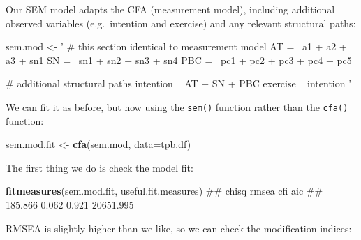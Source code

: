 \documentclass[]{article}
\newenvironment{Shaded}{\begin{snugshade}}{\end{snugshade}}
\newcommand{\KeywordTok}[1]{\textcolor[rgb]{0.13,0.29,0.53}{\textbf{#1}}}
\newcommand{\DataTypeTok}[1]{\textcolor[rgb]{0.13,0.29,0.53}{#1}}
\newcommand{\DecValTok}[1]{\textcolor[rgb]{0.00,0.00,0.81}{#1}}
\newcommand{\StringTok}[1]{\textcolor[rgb]{0.31,0.60,0.02}{#1}}
\newcommand{\OperatorTok}[1]{\textcolor[rgb]{0.81,0.36,0.00}{\textbf{#1}}}
\newcommand{\NormalTok}[1]{#1}
\theoremstyle{definition}
\theoremstyle{definition}
\theoremstyle{definition}
\theoremstyle{remark}
\begin{document}
Our SEM model adapts the CFA (measurement model), including additional
observed variables (e.g.~intention and exercise) and any relevant
structural paths:

\begin{Shaded}
\begin{Highlighting}[]
\NormalTok{sem.mod <-}\StringTok{ ' }
\StringTok{  # this section identical to measurement model}
\StringTok{  AT =~ a1 + a2 + a3 + sn1}
\StringTok{  SN =~ sn1 + sn2 + sn3 + sn4}
\StringTok{  PBC =~ pc1 + pc2 + pc3 + pc4 + pc5}

\StringTok{  # additional structural paths}
\StringTok{  intention ~ AT + SN + PBC}
\StringTok{  exercise ~ intention}
\StringTok{'}
\end{Highlighting}
\end{Shaded}

We can fit it as before, but now using the \texttt{sem()} function
rather than the \texttt{cfa()} function:

\begin{Shaded}
\begin{Highlighting}[]
\NormalTok{sem.mod.fit <-}\StringTok{ }\KeywordTok{cfa}\NormalTok{(sem.mod, }\DataTypeTok{data=}\NormalTok{tpb.df)}
\end{Highlighting}
\end{Shaded}

The first thing we do is check the model fit:

\begin{Shaded}
\begin{Highlighting}[]
\KeywordTok{fitmeasures}\NormalTok{(sem.mod.fit, useful.fit.measures)}
\NormalTok{##     chisq     rmsea       cfi       aic }
\NormalTok{##   185.866     0.062     0.921 20651.995}
\end{Highlighting}
\end{Shaded}

RMSEA is slightly higher than we like, so we can check the modification
indices:

\begin{Shaded}
\end{Shaded}
\end{document}
